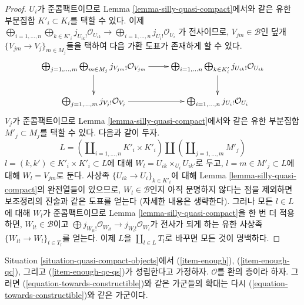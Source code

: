 \begin{proof}
$U_i$가 준콤팩트이므로 Lemma \ref{lemma-silly-quasi-compact}에서와 같은
유한 부분집합 $K'_i \subset K_i$를 택할 수 있다. 이제
$\bigoplus_{i = 1, \ldots, n}
\bigoplus_{k \in K'_i} j_{U_{ik}!}\mathcal{O}_{U_{ik}} \to
\bigoplus_{i = 1, \ldots, n} j_{U_i!}\mathcal{O}_{U_i}$
가 전사이므로, $V_{jm} \in \mathcal{B}$인 덮개
$\{V_{jm} \to V_j\}_{m \in M_j}$들을 택하여 다음 가환 도표가 존재하게 할
수 있다.
$$
\xymatrix{
\bigoplus_{j = 1, \ldots, m} \bigoplus_{m \in M_j}
j_{V_{jm}!}\mathcal{O}_{V_{jm}} \ar[d] \ar[r] &
\bigoplus_{i = 1, \ldots n} \bigoplus_{k \in K'_i}
j_{U_{ik}!}\mathcal{O}_{U_{ik}} \ar[d] \\
\bigoplus_{j = 1, \ldots, m} j_{V_j!}\mathcal{O}_{V_j} \ar[r] &
\bigoplus_{i = 1, \ldots, n} j_{U_i!}\mathcal{O}_{U_i}
}
$$
$V_j$가 준콤팩트이므로 Lemma \ref{lemma-silly-quasi-compact}에서와 같은
유한 부분집합 $M'_j \subset M_j$를 택할 수 있다. 다음과 같이 두자.
$$
L = \left(\coprod\nolimits_{i = 1, \ldots, n} K'_i \times K'_i \right)
\coprod
\left(\coprod\nolimits_{j = 1, \ldots, m} M'_j\right)
$$
$l = (k, k') \in K'_i \times K'_i \subset L$에 대해
$W_l = U_{ik} \times_{U_i} U_{ik'}$로 두고,
$l = m \in M'_j \subset L$에 대해 $W_l = V_{jm}$로 둔다. 사상족
$\{U_{ik} \to U_i\}_{k \in K'_i}$에 대해 Lemma
\ref{lemma-silly-quasi-compact}의 완전열들이 있으므로, $W_l \in \mathcal{B}$인지
아직 분명하지 않다는 점을 제외하면 보조정리의 진술과 같은 도표를 얻는다
(자세한 내용은 생략한다). 그러나 모든 $l \in L$에 대해 $W_l$가
준콤팩트이므로 Lemma \ref{lemma-silly-quasi-compact}을 한 번 더 적용하면,
$W_{lt} \in \mathcal{B}$이고
$\bigoplus j_{W_{lt}!}\mathcal{O}_{W_{lt}} \to j_{W_l!}\mathcal{O}_{W_l}$가
전사가 되게 하는 유한 사상족 $\{W_{lt} \to W_l\}_{t \in T_l}$를 얻는다.
이제 $L$을 $\coprod_{l \in L} T_l$로 바꾸면 모든 것이 명백하다.
\end{proof}

\begin{lemma}
\label{lemma-extension-towards-constructibles}
Situation \ref{situation-quasi-compact-objects}에서
(\ref{item-enough}), (\ref{item-enough-qc}), 그리고
(\ref{item-enough-qc-qs})가 성립한다고 가정하자. $\mathcal{O}$를 환의 층이라
하자. 그러면 (\ref{equation-towards-constructible})와 같은 가군들의 확대는
다시 (\ref{equation-towards-constructible})와 같은 가군이다.
\end{lemma}


